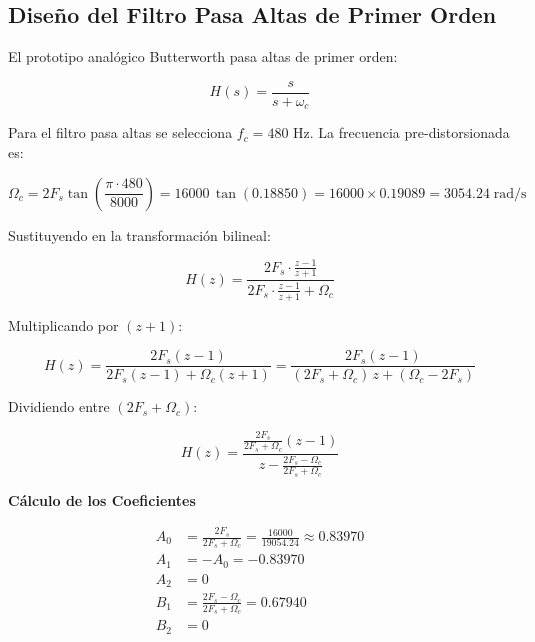 \subsection{Diseño del Filtro Pasa Altas de Primer Orden}


El prototipo analógico Butterworth pasa altas de primer orden:

\begin{equation}
    H(s) = \frac{s}{s + \omega_c}
    \label{eq:hp_analog}
\end{equation}

Para el filtro pasa altas se selecciona $f_c = 480$ Hz. La frecuencia pre-distorsionada es:

\begin{equation}
    \Omega_c = 2 F_s \tan\!\left(\frac{\pi \cdot 480}{8000}\right) = 16000\,\tan(0.18850) = 16000 \times 0.19089 = 3054.24 \;\text{rad/s}
\end{equation}

Sustituyendo en la transformación bilineal:

\begin{equation}
    H(z) = \frac{2F_s \cdot \frac{z-1}{z+1}}{2F_s \cdot \frac{z-1}{z+1} + \Omega_c}
\end{equation}

Multiplicando por $(z+1)$:

\begin{equation}
    H(z) = \frac{2F_s(z-1)}{2F_s(z-1) + \Omega_c(z+1)} = \frac{2F_s(z-1)}{(2F_s + \Omega_c)\,z + (\Omega_c - 2F_s)}
\end{equation}

Dividiendo entre $(2F_s + \Omega_c)$:

\begin{equation}
    H(z) = \frac{\frac{2F_s}{2F_s + \Omega_c}(z - 1)}{z - \frac{2F_s - \Omega_c}{2F_s + \Omega_c}}
\end{equation}

\textbf{Cálculo de los Coeficientes}

\begin{align}
    A_0 &= \frac{2F_s}{2F_s + \Omega_c} = \frac{16000}{19054.24} \approx 0.83970 \\[6pt]
    A_1 &= -A_0 = -0.83970 \\[6pt]
    A_2 &= 0 \\[6pt]
    B_1 &= \frac{2F_s - \Omega_c}{2F_s + \Omega_c} = 0.67940 \\[6pt]
    B_2 &= 0
\end{align}

